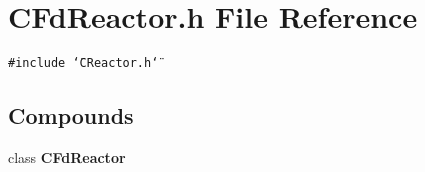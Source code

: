 \section{CFd\-Reactor.h File Reference}
\label{CFdReactor_8h}
{\tt \#include \char`\"{}CReactor.h\char`\"{}}\par
\subsection*{Compounds}
\begin{CompactItemize}
\item 
class {\bf CFd\-Reactor}
\end{CompactItemize}
